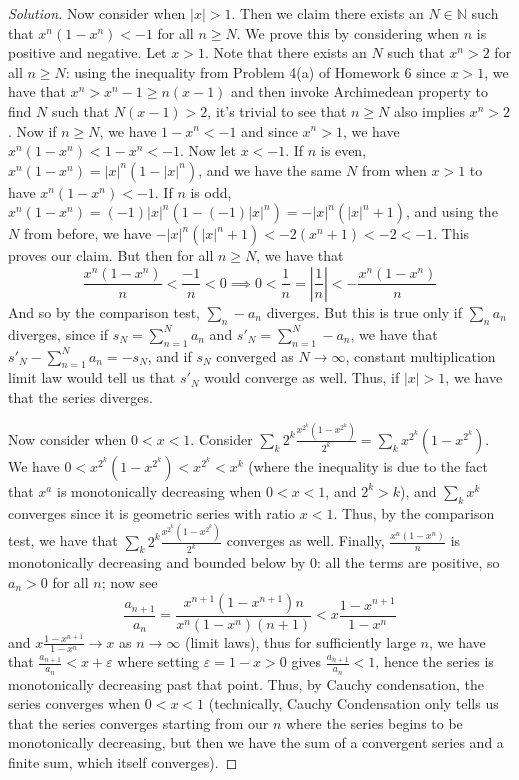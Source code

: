 \documentclass{article}
\newcommand{\N}{{\mathbb N}}
\newcommand{\ep}{{\varepsilon}}
\begin{document}
\begin{enumerate}
\begin{proof}[Solution]
		Now consider when $|x| > 1$.
		Then we claim there exists an $N\in \N$ such that $x^n(1-x^n) < -1$
		for all $n \geq N$.
		We prove this by considering when $n$ is positive and negative.
		Let $x > 1$.
		Note that there exists an $N$ such that $x^n > 2$
		for all $n \geq N$:
		using the inequality from Problem 4(a) of Homework 6 since $x > 1$,
		we have that $x^n > x^n - 1 \geq n(x-1)$
		and then invoke Archimedean property to find $N$ such that $N(x-1) > 2$,
		it's trivial to see that $n \geq N$ also implies $x^n > 2$.
		Now if $n \geq N$, we have $1-x^n < -1$ and since
		$x^n > 1$, we have $x^n(1-x^n) < 1-x^n < -1$.
		Now let $x < -1$.
		If $n$ is even, $x^n(1-x^n) = |x|^n(1-|x|^n)$,
		and we have the same $N$ from when $x > 1$
		to have $x^n(1-x^n) < -1$.
		If $n$ is odd, $x^n(1-x^n) = (-1)|x|^n(1-(-1)|x|^n) = -|x|^n(|x|^n + 1)$,
		and using the $N$ from before, we have $-|x|^n (|x|^n+1) < -2(x^n+1) < -2 < -1$.
		This proves our claim.
		But then for all $n \geq N$,
		we have that
		\[
			\frac{x^n(1-x^n)}{n} < \frac{-1}{n} < 0 \implies
			0 < \frac{1}{n} = \left\lvert \frac{1}{n} \right\rvert < -\frac{x^n(1-x^n)}{n}
		\]
		And so by the comparison test,
		$\sum_n -a_n$ diverges.
		But this is true only if $\sum_n a_n$ diverges,
		since if $s_N = \sum_{n=1}^N a_n$ and $s'_N = \sum_{n=1}^N -a_n$,
		we have that $s'_N -\sum_{n=1}^N a_n = -s_N$,
		and if $s_N$ converged as $N \to \infty$,
		constant multiplication limit law would tell us that $s'_N$
		would converge as well.
		Thus, if $|x| > 1$, we have that the series diverges.

		Now consider when $0 < x < 1$.
		Consider $\sum_k 2^k\frac{x^{2^k}(1-x^{2^k})}{2^k} = \sum_k x^{2^k}(1-x^{2^k})$.
		We have $0 < x^{2^k}(1-x^{2^k}) < x^{2^k} < x^k$
		(where the inequality is due to the fact that
		$x^a$ is monotonically decreasing when $0 < x < 1$,
		and $2^k > k$),
		and $\sum_k x^k$ converges since it is geometric series
		with ratio $x < 1$.
		Thus, by the comparison test,
		we have that $\sum_k 2^k\frac{x^{2^k}(1-x^{2^k})}{2^k}$
		converges as well.
		Finally, $\frac{x^n(1-x^n)}{n}$ is monotonically
		decreasing and bounded below by $0$:
		all the terms are positive, so $a_n > 0$ for all $n$;
		now see
		\[
			\frac{a_{n+1}}{a_n}
			= \frac{x^{n+1}(1-x^{n+1})n}{x^n(1-x^n)(n+1)}
			< x\frac{1-x^{n+1}}{1-x^n}{}
		\]
		and $x\frac{1-x^{n+1}}{1-x^n} \to x$ as $n \to \infty$
		(limit laws),
		thus for sufficiently large $n$,
		we have that $\frac{a_{n+1}}{a_n} < x + \ep$
		where setting $\ep = 1 - x > 0$ gives $\frac{a_{n+1}}{a_n} < 1$,
		hence the series is monotonically decreasing past that point.
		Thus, by Cauchy condensation, the series converges
		when $0 < x < 1$
		(technically, Cauchy Condensation only tells us that
		the series converges starting from our $n$
		where the series begins to be monotonically decreasing,
		but then we have the sum of a convergent series
		and a finite sum, which itself converges).


\end{proof}
\end{enumerate}
\end{document}
